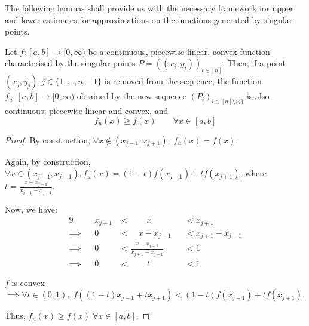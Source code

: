 The following lemmas shall provide us with the necessary framework for upper and lower estimates for approximations on the functions generated by singular points.

\begin{lmm}
	\label{lmm:sp-asian-upper-estimate}
	Let $ f:[a,b] \to [0, \infty) $ be a continuous, piecewise-linear, convex function characterised by the singular points $ P = ( (x_i, y_i) )_{i \in [n]} $. Then, if a point $ (x_j, y_j), j \in \{ 1, \dots, n-1\} $ is removed from the sequence, the function $ f_u: [a,b] \to [0, \infty) $ obtained by the new sequence $ (P_i)_{i \in [n] \setminus \{ j \}} $ is also continuous, piecewise-linear and convex, and
	\begin{equation}
		f_u(x) \ge f(x) \qquad \forall x \in [a,b]
	\end{equation}
\end{lmm}

\begin{proof}
	By construction, $ \forall x \notin ( x_{j-1} , x_{j+1} ), \; f_u(x) = f(x) $.
	
	Again, by construction, $ \forall x \in ( x_{j-1} , x_{j+1} ), f_u(x) = (1-t) f(x_{j-1}) + t f(x_{j+1}) $, where $ t = \frac{ x - x_{j-1} }{ x_{j+1} - x_{j-1} } $.
	
	Now, we have:
	\begin{alignat*}{9}
		          && x_{j-1}  & <  \qquad x          && <  x_{j+1} \\
		\implies  &&       0  & <  \quad x - x_{j-1} && <  x_{j+1} - x_{j-1} \\
		\implies  &&       0  & <  \frac{ x - x_{j-1} }{ x_{j+1} - x_{j-1} } && <  1 \\
		\implies  &&       0  & <  \qquad t          && <  1
	\end{alignat*}
	
	$f$ is convex $\implies \forall t \in (0,1), \; f( (1-t) x_{j-1} + t x_{j+1} ) < (1-t) f(x_{j-1}) + t f(x_{j+1}) $.
	
	Thus, $ f_u(x) \ge f(x) \; \forall x \in [a,b]$.
\end{proof}

